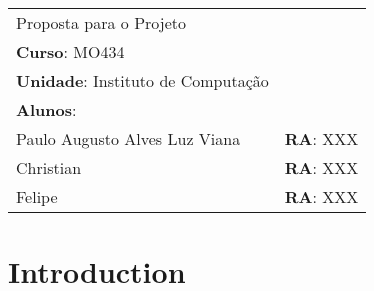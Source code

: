 \documentclass[
    11pt,
    a4paper,
    brazil
    ]{article}
\begin{document}
\begin{table}[H]
\begin{tabular}{ll}
{\Huge \centering  Proposta para o Projeto}\\
\vspace{1cm}
\noindent
\textbf{Curso}: MO434  \\
\textbf{Unidade}: Instituto de Computação\\

\textbf{Alunos}:\\
Paulo Augusto Alves Luz Viana & \textbf{RA}: XXX\\
Christian & \textbf{RA}: XXX\\
Felipe & \textbf{RA}: XXX\\
\end{tabular}
\end{table}

\section{Introduction}
\end{document}
